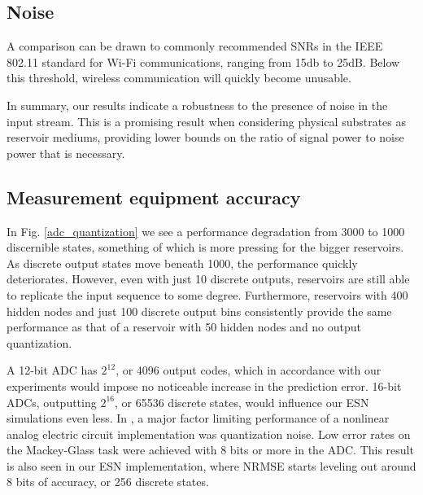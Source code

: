 \subsection{Noise}



A comparison can be drawn to commonly recommended SNRs in the IEEE 802.11
standard for Wi-Fi communications, ranging from 15db to 25dB. Below this
threshold, wireless communication will quickly become unusable.

In summary, our results indicate a robustness to the presence of noise in the
input stream. This is a promising result when considering physical substrates as
reservoir mediums, providing lower bounds on the ratio of signal power to noise
power that is necessary.

\subsection{Measurement equipment accuracy}

In Fig. \ref{adc_quantization} we see a performance degradation from 3000 to
1000 discernible states, something of which is more pressing for the bigger
reservoirs. As discrete output states move beneath 1000, the performance quickly
deteriorates. However, even with just 10 discrete outputs, reservoirs are still
able to replicate the input sequence to some degree. Furthermore, reservoirs
with 400 hidden nodes and just 100 discrete output bins consistently provide the
same performance as that of a reservoir with 50 hidden nodes and no output
quantization.

A 12-bit ADC has $2^{12}$, or 4096 output codes, which in accordance with our
experiments would impose no noticeable increase in the prediction error. 16-bit
ADCs, outputting $2^{16}$, or 65536 discrete states, would influence our ESN
simulations even less. In \cite{soriano_delay-based_2015}, a major factor
limiting performance of a nonlinear analog electric circuit implementation was
quantization noise. Low error rates on the Mackey-Glass task were achieved with
8 bits or more in the ADC. This result is also seen in our ESN implementation,
where NRMSE starts leveling out around 8 bits of accuracy, or 256 discrete
states.

